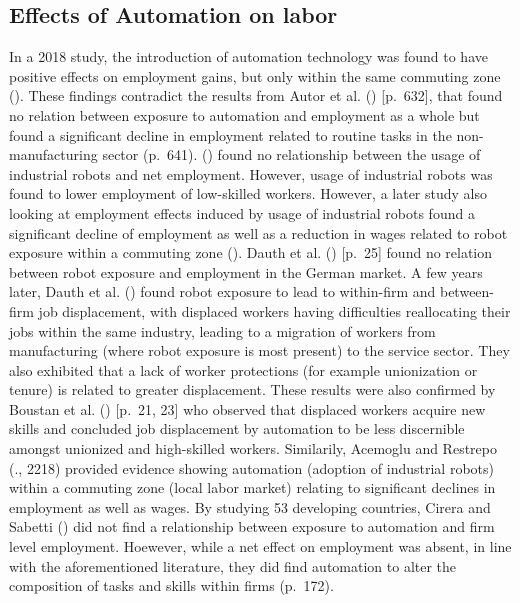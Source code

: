 \documentclass[
  11,
  a4paperpaper,
]{article}
\begin{document}
\subsection{Effects of Automation on
labor}\label{sec-effects-of-automation-on-labor}

In a 2018 study, the introduction of automation technology was found to
have positive effects on employment gains, but only within the same
commuting zone (). These findings contradict the results from Autor et al.
() {[}p.~632{]}, that found no
relation between exposure to automation and employment as a whole but
found a significant decline in employment related to routine tasks in
the non-manufacturing sector (p.~641).
()
found no relationship between the usage of industrial robots and net
employment. However, usage of industrial robots was found to lower
employment of low-skilled workers. However, a later study also looking
at employment effects induced by usage of industrial robots found a
significant decline of employment as well as a reduction in wages
related to robot exposure within a commuting zone
(). Dauth et al. ()
{[}p.~25{]} found no relation between robot exposure and employment in
the German market. A few years later, Dauth et al.
() found robot
exposure to lead to within-firm and between-firm job displacement, with
displaced workers having difficulties reallocating their jobs within the
same industry, leading to a migration of workers from manufacturing
(where robot exposure is most present) to the service sector. They also
exhibited that a lack of worker protections (for example unionization or
tenure) is related to greater displacement. These results were also
confirmed by Boustan et al.
() {[}p.~21, 23{]} who
observed that displaced workers acquire new skills and concluded job
displacement by automation to be less discernible amongst unionized and
high-skilled workers. Similarily, Acemoglu and Restrepo
(., 2218) provided
evidence showing automation (adoption of industrial robots) within a
commuting zone (local labor market) relating to significant declines in
employment as well as wages. By studying 53 developing countries, Cirera
and Sabetti () did not
find a relationship between exposure to automation and firm level
employment. Hoewever, while a net effect on employment was absent, in
line with the aforementioned literature, they did find automation to
alter the composition of tasks and skills within firms (p.~172).
\end{document}
